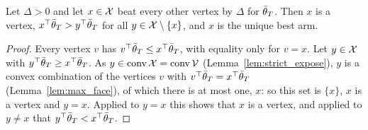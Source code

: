 \begin{lemma}
  \label{lem:min_gap_best_arm}
  \leanok
  Let $\Delta > 0$ and let $x \in \mathcal{X}$ beat every other vertex by $\Delta$ for $\bar{\theta}_T$. Then $x$
  is a vertex, $x^\top \bar{\theta}_T > y^\top \bar{\theta}_T$ for all $y \in \mathcal{X} \setminus \{x\}$, and $x$
  is the unique best arm.
\end{lemma}

\begin{proof}
  \leanok
  Every vertex $v$ has $v^\top \bar{\theta}_T \le x^\top \bar{\theta}_T$, with equality only for $v = x$.
  Let $y \in \mathcal{X}$ with $y^\top \bar{\theta}_T \ge x^\top \bar{\theta}_T$. As $y \in \operatorname{conv} \mathcal{X} = \operatorname{conv} \mathcal{V}$
  (Lemma~\ref{lem:strict_expose}), $y$ is a convex combination of the vertices $v$ with
  $v^\top \bar{\theta}_T = x^\top \bar{\theta}_T$ (Lemma~\ref{lem:max_face}), of which there is at most
  one, $x$: so this set is $\{x\}$, $x$ is a vertex and $y = x$. Applied to $y = x$ this shows
  that $x$ is a vertex, and applied to $y \ne x$ that $y^\top \bar{\theta}_T < x^\top \bar{\theta}_T$.
\end{proof}

